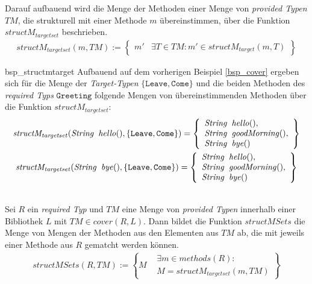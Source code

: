 \noindent
Darauf aufbauend wird die Menge der Methoden einer Menge von \emph{provided Typen} $\mathit{TM}$, die strukturell mit einer Methode $m$ übereinstimmen, über die Funktion $\mathit{structM_{targetset}}$ beschrieben.
\begin{gather*}
\mathit{structM_{targetset}(m, \mathit{TM})} := 
\left\{\begin{array}{l|l}
m'	& \exists T \in \mathit{TM}: m' \in \mathit{structM_{target}(m,T)}
\end{array}
\right\}
\end{gather*}
\noindent
\begin{example}{bsp_structmtarget}
Aufbauend auf dem vorherigen Beispiel \ref{bsp_cover} ergeben sich für die Menge der \emph{Target-Typen}  $\{\texttt{Leave}, \texttt{Come}\}$ und die beiden Methoden des \emph{required Typs} $\texttt{Greeting}$ folgende Mengen von übereinstimmenden Methoden über die Funktion $\mathit{structM_{targetset}}$:
\begin{gather*}
\mathit{structM_{targetset}(\mathit{String}\texttt{ }\mathit{hello()},\{\texttt{Leave}, \texttt{Come}\})} = 
\left\{
\begin{array}{l}
\mathit{String}\texttt{ }\mathit{hello()},\\
\mathit{String}\texttt{ }\mathit{goodMorning()},\\
\mathit{String}\texttt{ }\mathit{bye()}
\end{array}
\right\}\\
\mathit{structM_{targetset}(\mathit{String}\texttt{ }\mathit{bye()},\{\texttt{Leave}, \texttt{Come}\})} = 
\left\{
\begin{array}{l}
\mathit{String}\texttt{ }\mathit{hello()},\\
\mathit{String}\texttt{ }\mathit{goodMorning()},\\
\mathit{String}\texttt{ }\mathit{bye()}
\end{array}
\right\}
\end{gather*}
\end{example}
\\
Sei $R$ ein \emph{required Typ} und $\mathit{TM}$ eine Menge von \emph{provided Typen} innerhalb einer Bibliothek $L$ mit $\mathit{TM} \in \mathit{cover(R,L)}$. Dann bildet die Funktion $\mathit{structMSets}$ die Menge von Mengen der Methoden aus den Elementen aus $\mathit{TM}$ ab, die mit jeweils einer Methode aus $R$ gematcht werden können.
\begin{gather*}
\mathit{structMSets(R,\mathit{TM})} := 
\left\{M
\begin{array}{l|l}
&\exists \mathit{m} \in \mathit{methods(R)} : 
\\
&M = \mathit{structM_{targetset}(m,\mathit{TM})}
\end{array}
\right\}
\end{gather*}
